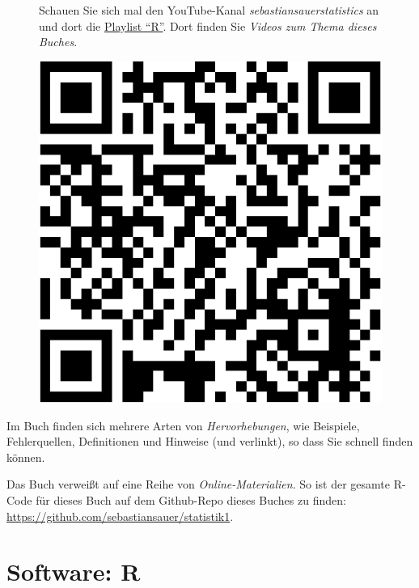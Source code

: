 \documentclass[
  letterpaper,
]{scrbook}
\theoremstyle{definition}
\theoremstyle{definition}
\theoremstyle{definition}
\theoremstyle{remark}
\begin{document}
\begin{figure}

\begin{minipage}{0.80\linewidth}
Schauen Sie sich mal den YouTube-Kanal \emph{sebastiansauerstatistics}
an und dort die
\href{https://www.youtube.com/playlist?list=PLRR4REmBgpIEaIyeNBgNGPgmhQJ_T1y8_}{Playlist
\enquote{R}}. Dort finden Sie \emph{Videos zum Thema dieses
Buches}.\end{minipage}%
%
\begin{minipage}{0.20\linewidth}

\begin{center}
\includegraphics[width=0.75\linewidth,height=\textheight,keepaspectratio]{005-orga_files/figure-pdf/unnamed-chunk-5-1.pdf}
\end{center}

\end{minipage}%

\end{figure}%

Im Buch finden sich mehrere Arten von \emph{Hervorhebungen}, wie
Beispiele, Fehlerquellen, Definitionen und Hinweise (und verlinkt), so
dass Sie schnell finden können.

Das Buch verweißt auf eine Reihe von \emph{Online-Materialien}. So ist
der gesamte R-Code für dieses Buch auf dem Github-Repo dieses Buches zu
finden: \url{https://github.com/sebastiansauer/statistik1}.

\section{Software: R}\label{software-r}
\end{document}
